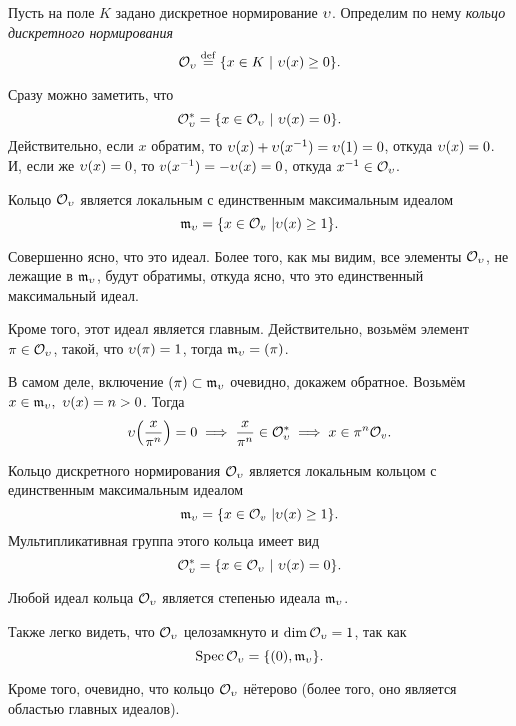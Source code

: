 	\begin{definition} 
		Пусть на поле $K$ задано дискретное нормирование $\upsilon$. Определим по нему \emph{кольцо дискретного нормирования}
		\[
			\mathcal{O}_{\upsilon} \stackrel{\mathrm{def}}{=} \{ x \in K \ \vert \ \upsilon(x) \ge 0 \}.
		\]
	\end{definition}

	Сразу можно заметить, что 
	\[
		\mathcal{O}_{\upsilon}^{*} = \{ x \in \mathcal{O}_{\upsilon} \ \vert \ \upsilon(x) = 0 \}.
	\]
	Действительно, если $x$ обратим, то $\upsilon(x) + \upsilon(x^{-1}) = \upsilon(1) = 0$, откуда $\upsilon(x) = 0$. И, если же $\upsilon(x) = 0$, то $v(x^{-1}) = -\upsilon(x) = 0$, откуда $x^{-1} \in \mathcal{O}_{\upsilon}$. 

	Кольцо $\mathcal{O}_{\upsilon}$ является локальным с единственным максимальным идеалом 
	\[
		\mathfrak{m}_{\upsilon} = \{ x \in \mathcal{O}_{v} \ \vert \upsilon(x) \ge 1 \}.
	\]

	Совершенно ясно, что это идеал. Более того, как мы видим, все элементы $\mathcal{O}_{\upsilon}$, не лежащие в $\mathfrak{m}_{\upsilon}$, будут обратимы, откуда ясно, что это единственный максимальный идеал. 

	Кроме того, этот идеал является главным. Действительно, возьмём элемент $\pi \in \mathcal{O}_{\upsilon}$, такой, что $\upsilon(\pi) = 1$, тогда $\mathfrak{m}_{\upsilon} = (\pi)$. 

	В самом деле, включение $(\pi) \subset \mathfrak{m}_{\upsilon}$ очевидно, докажем обратное. Возьмём $x \in \mathfrak{m}_{\upsilon}, \ \upsilon(x) = n > 0$.  Тогда 
	\[
		\v\lr*{\frac{x}{\pi^n}} = 0 \implies \frac{x}{\pi^n} \in \cO_{\v}^{*} \implies x \in \pi^n\cO_{v}.
	\]

	\begin{statement} 
		Кольцо дискретного нормирования $\mathcal{O}_{\upsilon}$ является локальным кольцом с единственным максимальным идеалом 
		\[
			\mathfrak{m}_{\upsilon} = \{ x \in \mathcal{O}_{v} \ \vert \upsilon(x) \ge 1 \}.
		\]	
		Мультипликативная группа этого кольца имеет вид 
		\[
			\mathcal{O}_{\upsilon}^{*} = \{ x \in \mathcal{O}_{\upsilon} \ \vert \ \upsilon(x) = 0 \}.
		\]	

	\end{statement}

	\begin{exercise}
		Любой идеал кольца $\mathcal{O}_{\upsilon}$ является степенью идеала $\mathfrak{m}_{\upsilon}$.
	\end{exercise}

	Также легко видеть, что $\mathcal{O}_{\upsilon}$ целозамкнуто и $\dim{\mathcal{O}_{\upsilon}} = 1$, так как 
	\[
	  	\operatorname{Spec}{\mathcal{O}_{\upsilon}} = \{ (0), \mathfrak{m}_{\upsilon} \}.
	  \]  

	Кроме того, очевидно, что кольцо $\mathcal{O}_{\upsilon}$ нётерово (более того, оно является областью главных идеалов). 


